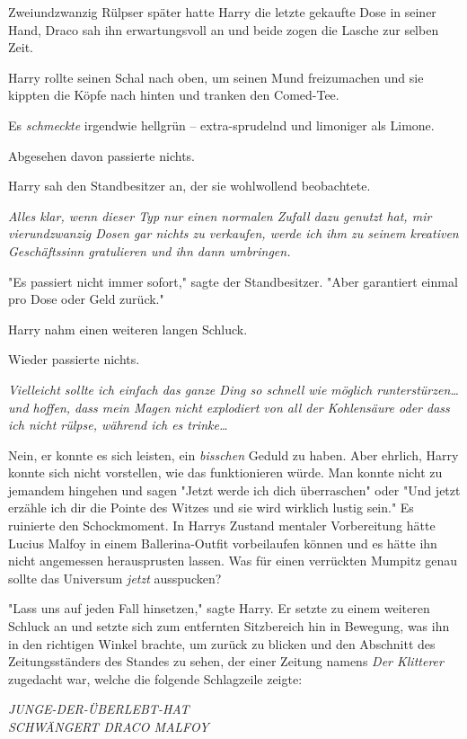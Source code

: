 {Zweiundzwanzig Rülpser später hatte Harry die letzte gekaufte Dose in seiner Hand, Draco sah ihn erwartungsvoll an und beide zogen die Lasche zur selben Zeit.

Harry rollte seinen Schal nach oben, um seinen Mund freizumachen und sie kippten die Köpfe nach hinten und tranken den Comed-Tee.

Es \emph{schmeckte} irgendwie hellgrün -- extra-sprudelnd und limoniger als Limone.

Abgesehen davon passierte nichts.

Harry sah den Standbesitzer an, der sie wohlwollend beobachtete.

\emph{Alles klar, wenn dieser Typ nur einen normalen Zufall dazu genutzt hat, mir vierundzwanzig Dosen gar nichts zu verkaufen, werde ich ihm zu seinem kreativen Geschäftssinn gratulieren und ihn dann umbringen.}

"Es passiert nicht immer sofort," sagte der Standbesitzer. "Aber garantiert einmal pro Dose oder Geld zurück."

Harry nahm einen weiteren langen Schluck.

Wieder passierte nichts.

\emph{Vielleicht sollte ich einfach das ganze Ding so schnell wie möglich runterstürzen… und hoffen, dass mein Magen nicht explodiert von all der Kohlensäure oder dass ich nicht rülpse, während ich es trinke…}

Nein, er konnte es sich leisten, ein \emph{bisschen} Geduld zu haben. Aber ehrlich, Harry konnte sich nicht vorstellen, wie das funktionieren würde. Man konnte nicht zu jemandem hingehen und sagen "Jetzt werde ich dich überraschen" oder "Und jetzt erzähle ich dir die Pointe des Witzes und sie wird wirklich lustig sein." Es ruinierte den Schockmoment. In Harrys Zustand mentaler Vorbereitung hätte Lucius Malfoy in einem Ballerina-Outfit vorbeilaufen können und es hätte ihn nicht angemessen herausprusten lassen. Was für einen verrückten Mumpitz genau sollte das Universum \emph{jetzt} ausspucken?

"Lass uns auf jeden Fall hinsetzen," sagte Harry. Er setzte zu einem weiteren Schluck an und setzte sich zum entfernten Sitzbereich hin in Bewegung, was ihn in den richtigen Winkel brachte, um zurück zu blicken und den Abschnitt des Zeitungsständers des Standes zu sehen, der einer Zeitung namens \emph{Der Klitterer} zugedacht war, welche die folgende Schlagzeile zeigte:

\emph{JUNGE-DER-ÜBERLEBT-HAT\\ SCHWÄNGERT DRACO MALFOY}

}
